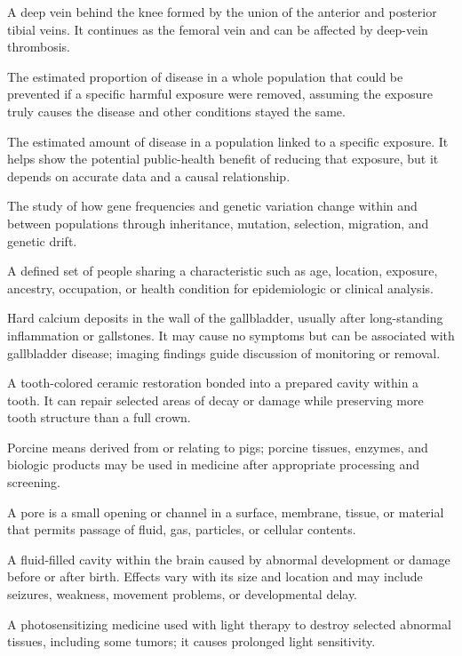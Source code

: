  A deep vein behind the knee formed by the union of the anterior and posterior tibial veins. It continues as the femoral vein and can be affected by deep-vein thrombosis.

 The estimated proportion of disease in a whole population that could be prevented if a specific harmful exposure were removed, assuming the exposure truly causes the disease and other conditions stayed the same.

 The estimated amount of disease in a population linked to a specific exposure. It helps show the potential public-health benefit of reducing that exposure, but it depends on accurate data and a causal relationship.

 The study of how gene frequencies and genetic variation change within and between populations through inheritance, mutation, selection, migration, and genetic drift.

 A defined set of people sharing a characteristic such as age, location, exposure, ancestry, occupation, or health condition for epidemiologic or clinical analysis.

 Hard calcium deposits in the wall of the gallbladder, usually after long-standing inflammation or gallstones. It may cause no symptoms but can be associated with gallbladder disease; imaging findings guide discussion of monitoring or removal.

 A tooth-colored ceramic restoration bonded into a prepared cavity within a tooth. It can repair selected areas of decay or damage while preserving more tooth structure than a full crown.

 Porcine means derived from or relating to pigs; porcine tissues, enzymes, and biologic products may be used in medicine after appropriate processing and screening.

 A pore is a small opening or channel in a surface, membrane, tissue, or material that permits passage of fluid, gas, particles, or cellular contents.

 A fluid-filled cavity within the brain caused by abnormal development or damage before or after birth. Effects vary with its size and location and may include seizures, weakness, movement problems, or developmental delay.

 A photosensitizing medicine used with light therapy to destroy selected abnormal tissues, including some tumors; it causes prolonged light sensitivity.

